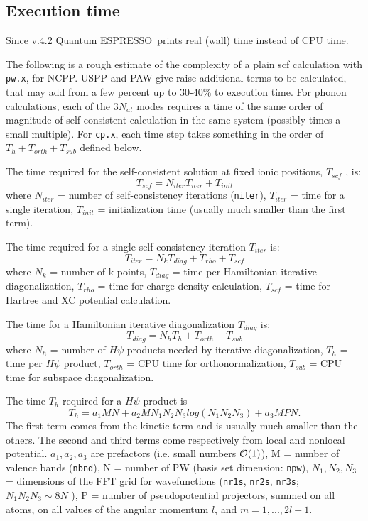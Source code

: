 \documentclass[12pt,a4paper]{article}
\def\qe{{\sc Quantum ESPRESSO}}
\def\pw.x{\texttt{pw.x}}
\def\cp.x{\texttt{cp.x}}
\begin{document}
\subsection{Execution time}

Since v.4.2 \qe\ prints real (wall) time instead of CPU time.

The following is a rough estimate of the complexity of a plain
scf calculation with \pw.x, for NCPP. USPP and PAW 
give raise additional terms to be calculated, that may add from a 
few percent 
up to 30-40\% to execution time. For phonon calculations, each of the
$3N_{at}$ modes requires a time of the same order of magnitude of
self-consistent calculation in the same system (possibly times a small multiple). 
For \cp.x, each time step takes something in the order of
$T_h + T_{orth} + T_{sub}$ defined below.

The time required for the self-consistent solution at fixed ionic
positions, $T_{scf}$ , is:
$$T_{scf} = N_{iter} T_{iter} + T_{init}$$
where $N_{iter}$  = number of self-consistency iterations (\texttt{niter}), 
$T_{iter}$ =
time for a single iteration, $T_{init}$ = initialization time
(usually much smaller than the first term).

The time required for a single self-consistency iteration $T_{iter}$ is:
$$T_{iter} = N_k T_{diag} +T_{rho} + T_{scf}$$
where $N_k$ = number of k-points, $T_{diag}$ = time per 
Hamiltonian iterative diagonalization, $T_{rho}$ = time for charge density 
calculation, $T_{scf}$ = time for Hartree and XC potential
calculation.
    
The time for a Hamiltonian iterative diagonalization $T_{diag}$ is:
$$T_{diag} = N_h T_h + T_{orth} + T_{sub}$$
where $N_h$ = number of $H\psi$ products needed by iterative diagonalization,
$T_h$ = time per $H\psi$ product, $T_{orth}$ = CPU time for 
orthonormalization, $T_{sub}$ = CPU time for subspace diagonalization.
    
The time $T_h$ required for a $H\psi$ product is
$$T_h = a_1 M N + a_2 M N_1 N_2 N_3 log(N_1 N_2 N_3 ) + a_3 M P N. $$
The first term comes from the kinetic term and is usually much smaller
than the others. The second and third terms come respectively from local
and nonlocal potential. $a_1, a_2, a_3$ are prefactors (i.e.
small numbers ${\cal O}(1)$), M = number of valence
bands (\texttt{nbnd}), N = number of PW (basis set dimension: \texttt{npw}), $N_1, N_2, N_3$ =
dimensions of the FFT grid for wavefunctions (\texttt{nr1s}, \texttt{nr2s},
\texttt{nr3s}; $N_1 N_2 N_3 \sim 8N$ ), 
P = number of pseudopotential projectors, summed on all atoms, on all values of the
angular momentum $l$, and $m = 1, . . . , 2l + 1$.
\end{document}

